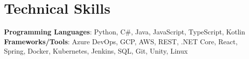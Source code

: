 \section{Technical Skills}
 \begin{itemize}[leftmargin=0.15in, label={}]
    \small{\item{
      \textbf{Programming Languages}{: Python, C\#, Java, JavaScript, TypeScript, Kotlin } \\
     \textbf{Frameworks/Tools}{: Azure DevOps, GCP, AWS, REST, .NET Core, React, Spring, Docker, Kubernetes, Jenkins, SQL, Git, Unity, Linux }\\
    }}
 \end{itemize}